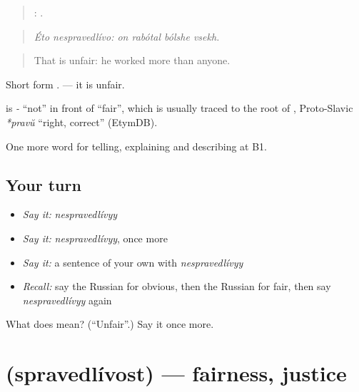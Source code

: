 \begin{quote}
 :    .
\end{quote}

\begin{quote}
\emph{Éto nespravedlívo: on rabótal bólshe vsekh.}
\end{quote}

\begin{quote}
That is unfair: he worked more than anyone.
\end{quote}

Short form \emph{}. \emph{} — it is unfair.

\begin{cousinweb}
\textbf{} is \emph{-} \textquotedblleft{}not\textquotedblright{} in front of \emph{} \textquotedblleft{}fair\textquotedblright{}, which is usually traced to the root of \emph{}, Proto-Slavic \emph{*pravŭ} \textquotedblleft{}right, correct\textquotedblright{} (EtymDB).
\end{cousinweb}

\begin{grammarlens}[title={What you've built}]
One more word for telling, explaining and describing at B1.
\end{grammarlens}

\subsection*{Your turn}
\begin{itemize}
\raggedright
  \item \emph{Say it:} \emph{nespravedlívyy}
  \item \emph{Say it:} \emph{nespravedlívyy}, once more
  \item \emph{Say it:} a sentence of your own with \emph{nespravedlívyy}
  \item \emph{Recall:} say the Russian for obvious, then the Russian for fair, then say \emph{nespravedlívyy} again
\end{itemize}

\begin{tcolorbox}[breakable,colback=teal!4,colframe=teal!35!black,title={Before you move on}]
What does  mean? (\textquotedblleft{}Unfair\textquotedblright{}.) Say it once more.
\end{tcolorbox}
\section[\texorpdfstring{\ru{справедливость} (spravedlívost)}{справедливость (spravedlívost)}]{ (spravedlívost) — fairness, justice}

